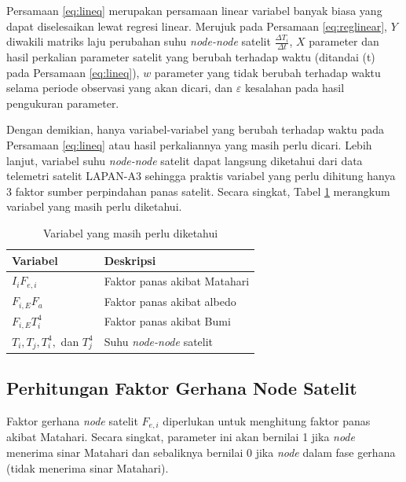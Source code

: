 Persamaan \ref{eq:lineq} merupakan persamaan linear variabel banyak biasa yang
dapat diselesaikan lewat regresi linear. Merujuk pada Persamaan
\ref{eq:reglinear}, $Y$ diwakili matriks laju perubahan suhu \textit{node-node}
satelit $\frac{\Delta T_i}{\Delta t}$, $X$ parameter dan hasil perkalian
parameter satelit yang berubah terhadap waktu (ditandai (t) pada Persamaan
\ref{eq:lineq}), $w$ parameter yang tidak berubah terhadap waktu selama periode
observasi yang akan dicari, dan $\varepsilon$ kesalahan pada hasil pengukuran parameter.  

Dengan demikian, hanya variabel-variabel yang berubah terhadap waktu pada
Persamaan \ref{eq:lineq} atau hasil perkaliannya yang masih perlu dicari.
Lebih lanjut, variabel suhu \textit{node-node} satelit dapat langsung
diketahui dari data telemetri satelit LAPAN-A3 sehingga praktis variabel yang
perlu dihitung hanya 3 faktor sumber perpindahan panas satelit. Secara singkat,
Tabel \ref{table:unknown} merangkum variabel yang masih perlu diketahui.

\begin{table}[!ht]
\begin{center}
\caption{Variabel yang masih perlu diketahui}
\label{table:unknown}
\begin{tabular}{|l|l|}
\hline
Variabel & Deskripsi \\ \hline
	$I_i F_{e,i}$        & Faktor panas akibat Matahari         \\ \hline
	$F_{i,E} F_a$        & Faktor panas akibat albedo         \\ \hline
	$F_{i,E} T_i^4$        & Faktor panas akibat Bumi         \\ \hline
	$T_i, T_j, T_i^4,$ dan $T_j^4$        & Suhu \textit{node-node} satelit         \\ \hline
\end{tabular}
\end{center}
\vspace{-5mm}
\end{table}

\subsection{Perhitungan Faktor Gerhana Node Satelit}

Faktor gerhana \textit{node} satelit $F_{e,i}$ diperlukan untuk menghitung faktor panas
akibat Matahari. Secara singkat, parameter ini akan bernilai 1 jika \textit{node}
menerima sinar Matahari dan sebaliknya bernilai 0 jika \textit{node} dalam fase gerhana
(tidak menerima sinar Matahari).


